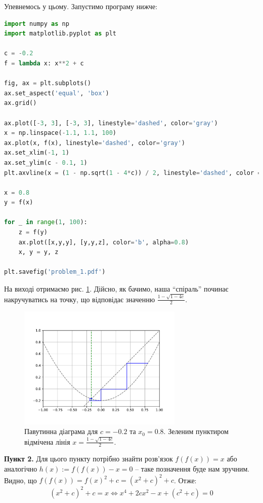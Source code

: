 \documentclass[oneside,solution]{tmpl}
\begin{document}
Упевнемось у цьому. Запустимо програму нижче:
\begin{lstlisting}[language=Python]
import numpy as np
import matplotlib.pyplot as plt

c = -0.2
f = lambda x: x**2 + c

fig, ax = plt.subplots()
ax.set_aspect('equal', 'box')
ax.grid()

ax.plot([-3, 3], [-3, 3], linestyle='dashed', color='gray')
x = np.linspace(-1.1, 1.1, 100)
ax.plot(x, f(x), linestyle='dashed', color='gray')
ax.set_xlim(-1, 1)
ax.set_ylim(c - 0.1, 1)
plt.axvline(x = (1 - np.sqrt(1 - 4*c)) / 2, linestyle='dashed', color = 'green', label = 'axvline - full height')

x = 0.8
y = f(x)

for _ in range(1, 100):
    z = f(y)
    ax.plot([x,y,y], [y,y,z], color='b', alpha=0.8)
    x, y = y, z
    
plt.savefig('problem_1.pdf')
\end{lstlisting}

На виході отримаємо рис. \ref{fig:1}. Дійсно, як бачимо, наша ``спіраль'' починає накручуватись на точку, що відповідає значенню $\frac{1-\sqrt{1-4c}}{2}$.

\begin{figure}
    \centering
    \includegraphics[width=0.7\textwidth]{images/hw_9/1.pdf}
    \caption{Павутинна діаграма для $c=-0.2$ та $x_0=0.8$. Зеленим пунктиром відмічена лінія $x=\frac{1-\sqrt{1-4c}}{2}$.}
    \label{fig:1}
\end{figure}

\vspace{7.5px}
\textbf{Пункт 2.} Для цього пункту потрібно знайти розв'язок $f(f(x)) = x$ або аналогічно $h(x) := f(f(x)) - x = 0$ -- таке позначення буде нам зручним. Видно, що $f(f(x)) = f(x)^2 + c = (x^2 + c)^2 + c$. Отже:
\begin{equation}
    (x^2 + c)^2 + c = x \iff x^4 + 2cx^2 - x + (c^2 + c) = 0
\end{equation}
\end{document}
